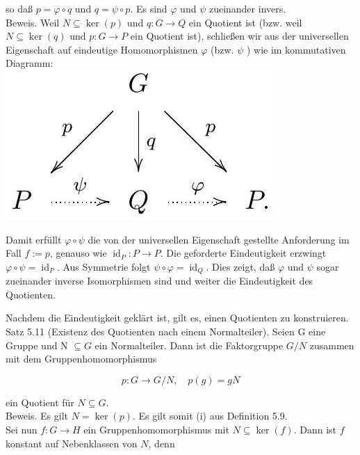 \documentclass[10pt, letterpaper]{article}
\begin{document}
so daß $p=\varphi \circ q$ und $q=\psi \circ p$. Es sind $\varphi$ und $\psi$ zueinander invers.\\
Beweis. Weil $N \subseteq \operatorname{ker}(p)$ und $q: G \rightarrow Q$ ein Quotient ist (bzw. weil $N \subseteq \operatorname{ker}(q)$ und $p: G \rightarrow P$ ein Quotient ist), schließen wir aus der universellen Eigenschaft auf eindeutige Homomorphismen $\varphi$ (bzw. $\psi$ ) wie im kommutativen Diagramm:\\
\includegraphics[max width=\textwidth, center]{2025_06_13_6ba93caed1e95a95104eg-038}

Damit erfüllt $\varphi \circ \psi$ die von der universellen Eigenschaft gestellte Anforderung im Fall $f:=p$, genauso wie $\operatorname{id}_{P}: P \rightarrow P$. Die geforderte Eindeutigkeit erzwingt $\varphi \circ \psi=\operatorname{id}_{P}$. Aus Symmetrie folgt $\psi \circ \varphi=\operatorname{id}_{Q}$. Dies zeigt, daß $\varphi$ und $\psi$ sogar zueinander inverse Isomorphismen sind und weiter die Eindeutigkeit des Quotienten.

Nachdem die Eindeutigkeit geklärt ist, gilt es, einen Quotienten zu konstruieren.\\
Satz 5.11 (Existenz des Quotienten nach einem Normalteiler). Seien G eine Gruppe und N $\subseteq G$ ein Normalteiler. Dann ist die Faktorgruppe $G / N$ zusammen mit dem Gruppenhomomorphismus

$$
p: G \rightarrow G / N, \quad p(g)=g N
$$

ein Quotient für $N \subseteq G$.\\
Beweis. Es gilt $N=\operatorname{ker}(p)$. Es gilt somit (i) aus Definition 5.9.\\
Sei nun $f: G \rightarrow H$ ein Gruppenhomomorphismus mit $N \subseteq \operatorname{ker}(f)$. Dann ist $f$ konstant auf Nebenklassen von $N$, denn
\end{document}
